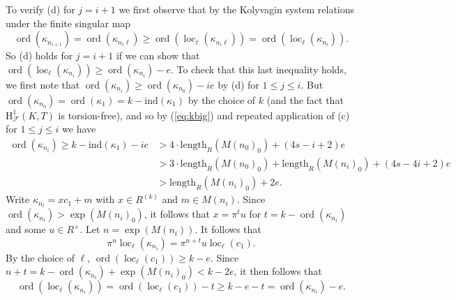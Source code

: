 \documentclass[10pt]{amsart}
\numberwithin{equation}{section}
\theoremstyle{definition}
\theoremstyle{remark}
\newcommand{\rH}{\mathrm{H}}
\DeclareMathOperator{\loc}{loc}
\DeclareMathOperator{\ord}{ord}
\newcommand{\CF}{\mathcal{F}}
\newcommand{\kap}{\kappa}
\newcommand{\ind}{\mathrm{ind}}
\begin{document}
To verify (d) for $j=i+1$ we first observe that by the Kolyvagin system relations under the finite singular map 
$$
\ord(\kap_{n_{i+1}}) = \ord(\kap_{n_{i}\ell}) \geqslant \ord(\loc_{\ell}(\kap_{n_{i}\ell}))= \ord(\loc_\ell(\kap_{n_{i}})).
$$
So (d) holds for $j=i+1$ if we can show that $\ord(\loc_\ell(\kap_{n_{i}})) \geqslant \ord(\kap_{n_{i}})-e$.
To check that this last inequality holds, we first note that
$\ord(\kap_{n_{i}}) \geqslant \ord(\kap_{n_0}) - ie$ by (d) for $1\leqslant j \leqslant i$. 
But $\ord(\kap_{n_0}) =\ord(\kap_1)= k-\ind(\kap_1)$ by the choice of $k$ (and the fact that $\rH^1_{\CF}(K,T)$ is torsion-free), 
and so by (\ref{eq:kbig}) and repeated application of (c) for $1\leqslant j\leqslant i$ we have
\begin{equation*}\begin{split}
\ord(\kap_{n_i}) \geqslant k-\ind(\kap_1) - ie & >  4\cdot\mathrm{length}_R(M(n_0)_0)+(4s-i+2)e \\
& > 3\cdot\mathrm{length}_R(M(n_0)_0) + \mathrm{length}_R(M(n_i)_0) +(4s-4i+2) e  \\
& > \mathrm{length}_R(M(n_i)_0) + 2e.
\end{split}\end{equation*}
Write $\kap_{n_{i}} = x c_1 + m$ with $x\in R^{(k)}$ and $m\in M(n_i)$. 
Since $\ord(\kap_{n_i}) > \exp(M(n_i)_0)$, it follows that 
$x = \pi^t u$ for $t = k-\ord(\kap_{n_{i}})$ and some $u\in R^\times$. Let $n = \exp(M(n_{i}))$.
It follows that
$$
\pi^n\loc_\ell(\kap_{n_i}) = \pi^{n+t} u\loc_\ell(c_1).
$$
By the choice of $\ell$, $\ord(\loc_\ell(c_1)) \geqslant k - e$. Since $n+t = k - \ord(\kap_{n_i}) + \exp(M(n_i)_0)
<k - 2e$, it then follows
that 
$$
\ord(\loc_\ell(\kap_{n_i})) = \ord(\loc_\ell(c_1)) - t \geqslant k - e -t = \ord(\kap_{n_i})-e.
$$
\end{document}
